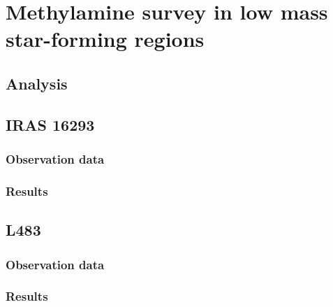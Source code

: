 \chapter{Methylamine survey in low mass star-forming regions
  \label{chap:LMSFRs}}

\section{Analysis}

\section{IRAS 16293}
\subsection{Observation data}
\subsection{Results}

\section{L483}
\subsection{Observation data}
\subsection{Results}
